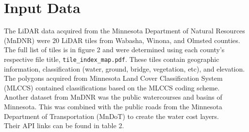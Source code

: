 \documentclass[article,12pt]{article}
\numberwithin{equation}{section}
\begin{document}
\begin{adjustwidth}{-.88in}{-.88in}
{\begin{tabular}{|l|p{.09\linewidth}|p{.17\linewidth}|p{.065\linewidth}|p{.1\linewidth}|p{.28\linewidth}|p{.15\linewidth}|}
	\end{tabular}
}
\end{adjustwidth}

\section{Input Data}
\indent The LiDAR data acquired from the Minnesota Department of Natural Resources (MnDNR) were 20 LiDAR tiles from Wabasha, Winona, and Olmsted counties. The full list of tiles is in figure 2 and were determined using each county's respective file title, \texttt{tile\_index\_map.pdf}. These tiles contain geographic information, classification (water, ground, bridge, vegetation, etc), and elevation. 
\\
\indent The polygons acquired from Minnesota Land Cover Classification System (MLCCS) contained classifications based on the MLCCS coding scheme. 
\\
\indent Another dataset from MnDNR was the public watercourses and basins of Minnesota. This was combined with the public roads from the Minnesota Department of Transportation (MnDoT) to create the water cost layers. \\
\indent Their API links can be found in table 2. \vspace{.5in}
\end{document}
